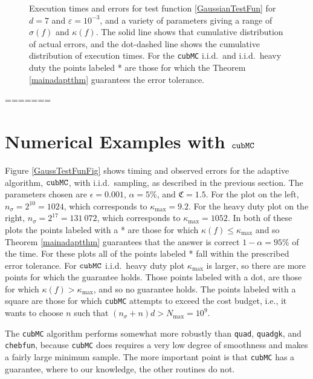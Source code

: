 \documentclass[graybox]{svmult}
\newcommand{\fudge}{\mathfrak{C}}
\newcommand{\aMC}{{\tt cubMC}\xspace}
\begin{document}
\begin{figure}
\caption{Execution times and errors for test function \eqref{GaussianTestFun} for $d=7$ and $\varepsilon=10^{-3}$, and a variety of parameters giving a range of $\sigma(f)$ and $\kappa(f)$. The solid line shows that cumulative distribution of actual errors, and the dot-dashed line shows the cumulative distribution of execution times.  For the {\tt cubMC} i.i.d.\ and i.i.d.\ heavy duty the points labeled * are those for which the Theorem \ref{mainadaptthm} guarantees the error tolerance.\label{GausstianTestFunHDFig}}
\end{figure}
=======
\section{Numerical Examples with $\aMC$} \label{numerexsec}

Figure \ref{GaussTestFunFig} shows timing and observed errors for the adaptive algorithm, $\aMC$, with i.i.d.\ sampling, as described in the previous section.  The parameters chosen are $\epsilon=0.001$, $\alpha=5\%$, and  $\fudge=1.5$.  For the plot on the left, $n_\sigma=2^{10}=1024$, which corresponds to  $\kappa_{\max}=9.2$.  For the heavy duty plot on the right, $n_\sigma=2^{17}=131\ 072$, which corresponds to  $\kappa_{\max}=1052$. In both of these plots the points labeled with a * are those for which $\kappa(f) \le \kappa_{\max}$ and so Theorem \ref{mainadaptthm} guarantees that the answer is correct $1-\alpha= 95\%$ of the time.  For these plots all of the points labeled * fall within the prescribed error tolerance.  For $\aMC$ i.i.d.\ heavy duty plot $\kappa_{\max}$ is larger, so there are more points for which the guarantee holds.  Those points labeled with a dot, are those for which $\kappa(f) > \kappa_{\max}$, and so no guarantee holds. The points labeled with a square are those for which \aMC attempts to exceed the cost budget, i.e., it wants to choose $n$ such that $(n_{\sigma}+n)d > N_{\max}=10^9$. 

The {\tt cubMC} algorithm performs somewhat more robustly than {\tt quad}, {\tt quadgk}, and {\tt chebfun}, because \aMC does requires a very low degree of smoothness and makes a fairly large minimum sample.  The more important point is that \aMC has a guarantee, where to our knowledge, the other routines do not.
\end{document}
